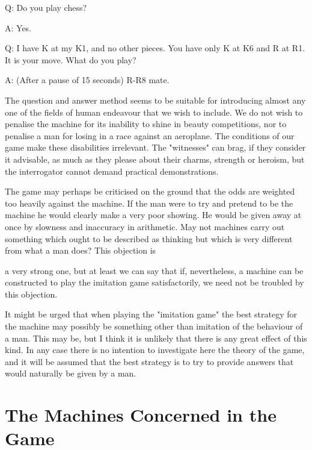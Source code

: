 \documentclass{article}
\begin{document}
Q: Do you play chess?

A: Yes.

Q: I have K at my K1, and no other pieces. You have only K at K6 and R at R1. It is your move. What do you play?

A: (After a pause of 15 seconds) R-R8 mate.

The question and answer method seems to be suitable for introducing almost any one of the fields of human endeavour that we wish to include. We do not wish to penalise the machine for its inability to shine in beauty competitions, nor to penalise a man for losing in a race against an aeroplane. The conditions of our game make these disabilities irrelevant. The "witnesses" can brag, if they consider it advisable, as much as they please about their charms, strength or heroism, but the interrogator cannot demand practical demonstrations.

The game may perhaps be criticised on the ground that the odds are weighted too heavily against the machine. If the man were to try and pretend to be the machine he would clearly make a very poor showing. He would be given away at once by slowness and inaccuracy in arithmetic. May not machines carry out something which ought to be described as thinking but which is very different from what a man does? This objection is

a very strong one, but at least we can say that if, nevertheless, a machine can be constructed to play the imitation game satisfactorily, we need not be troubled by this objection.

It might be urged that when playing the "imitation game" the best strategy for the machine may possibly be something other than imitation of the behaviour of a man. This may be, but I think it is unlikely that there is any great effect of this kind. In any case there is no intention to investigate here the theory of the game, and it will be assumed that the best strategy is to try to provide answers that would naturally be given by a man.


\section{The Machines Concerned in the Game}
\end{document}
